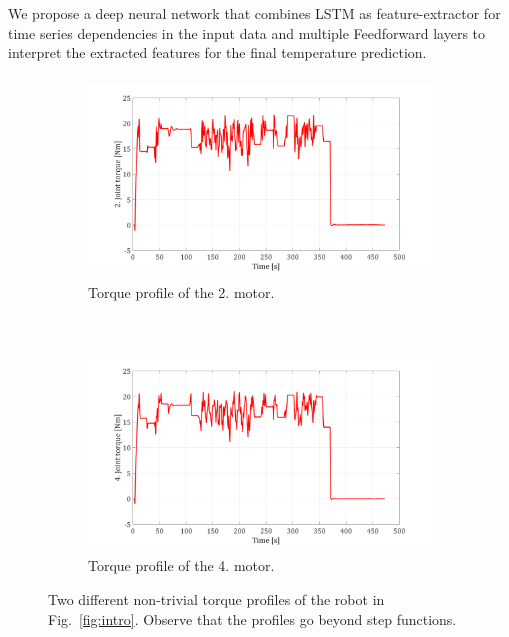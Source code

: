 \documentclass{ifacconf}
\begin{document}
We propose a deep neural network that combines LSTM as feature-extractor for time series dependencies in the input data and multiple Feedforward layers to interpret the extracted features for the final temperature prediction.

\begin{figure}[t!]
	\centering
	\begin{subfigure}[b]{1.\columnwidth}
		\centering
		\includegraphics[height=2.1in]{./pictures/applications/T2.png}
		\caption{Torque profile of the 2. motor.}
	\end{subfigure}%
	~ 
	\begin{subfigure}[b]{1.\columnwidth}
		\centering
		\includegraphics[height=2.1in]{./pictures/applications/T4.png}
		\caption{Torque profile of the 4. motor.}
	\end{subfigure}
	\caption{Two different non-trivial  torque profiles of the robot in Fig.~\ref{fig:intro}. Observe that the profiles go beyond step functions. }
	\label{jointtorque}
\end{figure}
\end{document}
